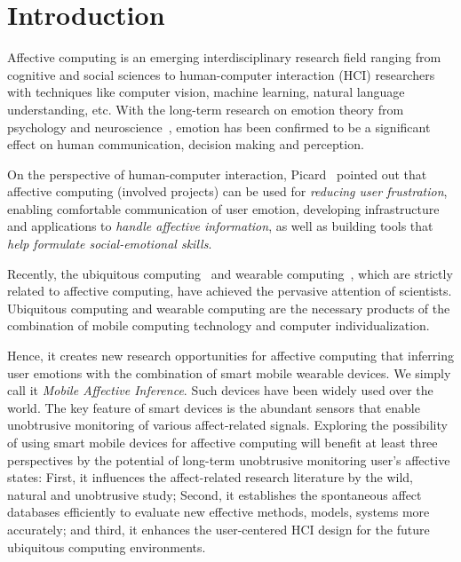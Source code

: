 \section{Introduction}\label{sec:intro}

Affective computing is an emerging interdisciplinary research field ranging from cognitive and social sciences to human-computer interaction (HCI) researchers with techniques like computer vision, machine learning, natural language understanding, etc.
With the long-term research on emotion theory from psychology and neuroscience~\cite{james1884emotion, turkle2005second}, emotion has been confirmed to be a significant effect \cite{james2013emotion} on human communication, decision making and perception.

On the perspective of human-computer interaction, Picard~\cite{picard1999affective} pointed out that affective computing (involved projects) can be used for \emph{reducing user frustration}, enabling comfortable communication of user emotion, developing infrastructure and applications to \emph{handle affective information}, as well as building tools that \emph{help formulate social-emotional skills}.

Recently, the ubiquitous computing~\cite{weiser1991computer} and wearable computing~\cite{starner1996human}, which are strictly related to affective computing, have achieved the pervasive attention of scientists. Ubiquitous computing and wearable computing are the necessary products of the combination of mobile computing technology and computer individualization.

Hence, it creates new research opportunities for affective computing that inferring user emotions with the combination of smart mobile wearable devices. We simply call it \emph{Mobile Affective Inference}. Such devices have been widely used over the world. The key feature of smart devices is the abundant sensors that enable unobtrusive monitoring of various affect-related signals. Exploring the possibility of using smart mobile devices for affective computing will benefit at least three perspectives by the potential of long-term unobtrusive monitoring user’s affective states: First, it influences the affect-related research literature by the wild, natural and unobtrusive study; Second, it establishes the spontaneous affect databases efficiently to evaluate new effective methods, models, systems more accurately; and third, it enhances the user-centered HCI design for the future ubiquitous computing environments.

